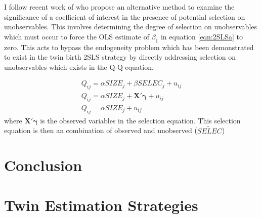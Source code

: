\documentclass{article}[11pt,subeqn]
\newcommand{\vect}[1]{\mathbf{#1}}
\begin{document}
\begin{spacing}{1.25}
I follow recent work of \citet{Altonjietal2005, Altonjietal2008} who propose an alternative method to examine the significance of a coefficient of interest in the presence of potential selection on unobservables.  This involves determining the degree of selection on unobservables which must occur to force the OLS estimate of $\beta_1$ in equation \ref{eqn:2SLSa} to zero.  This acts to bypass the endogeneity problem which has been demonstrated to exist in the twin birth 2SLS strategy by directly addressing selection on unobservables which exists in the Q-Q equation.


\begin{subequations}
\label{eqn:selection}
\begin{eqnarray}
Q_{ij}=\alpha SIZE_{j}+\beta SELEC_j+u_{ij} \label{eqn:selectionAC}\\
Q_{ij}=\alpha SIZE_{j}+\vect{X'\gamma}+u_{ij} \label{eqn:selectionC}\\
Q_{ij}=\alpha SIZE_{j}+u_{ij} \label{eqn:selectionNC}
\end{eqnarray}
\end{subequations}
where $\vect{X'\gamma}$ is the observed variables in the selection equation.  This selection equation is then an combination of observed and unobserved ($\widetilde{SELEC}$) 
\section{Conclusion}
\label{scn:conclusion}

\newpage


\newpage
\appendix
\section{Twin Estimation Strategies}
\label{scn:litrev}

\vspace{19.2cm}	


\end{spacing}
\end{document}
